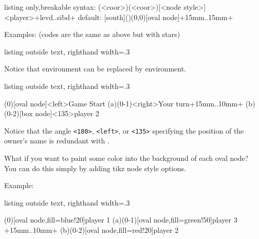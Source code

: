 \begin{tcblisting}{listing only,breakable}
syntax: (<coor>)(<coor>)[<node style>]{<player>}+levd..sibd+
default: [south]()(0,0)[oval node]{}+15mm..15mm+
\end{tcblisting}


Examples: (codes are the same as above but with stars)

\begin{tcblisting}{listing outside text, righthand width=.3\linewidth}
\end{tcblisting}

Notice that  environment can be replaced by  environment.

\begin{tcblisting}{listing outside text, righthand width=.3\linewidth}
\begin{istgame}
\xtdistance{20mm}{20mm}
\istroot*[right](0)[oval node]<left>{Game Start}
  \istb  \istb  \endist
\istroot(a)(0-1)<right>{Your turn}+15mm..10mm+
  \istb  \istb  \endist
\istroot*[right](b)(0-2)[box node]<135>{player 2}
  \istb  \istb  \endist
\end{istgame}
\end{tcblisting}

Notice that the angle \verb|<180>|, \verb|<left>|, or \verb|<135>| specifying the position of the owner's name is redundant with \cmd{\istroot*}.

What if you want to paint some color into the background of each oval node? You can do this simply by adding tikz node style options.

Example:

\begin{tcblisting}{listing outside text, righthand width=.3\linewidth}
\begin{istgame}
\xtdistance{20mm}{20mm}
\istroot*[right](0)[oval node,fill=blue!20]{player 1}
  \istb  \istb  \endist
\istroot*(a)(0-1)[oval node,fill=green!50]{player 3}%
  +15mm..10mm+
  \istb  \istb  \endist
\istroot*[right](b)(0-2)[oval node,fill=red!20]{player 2}
  \istb  \istb  \endist
\end{istgame}
\end{tcblisting}


